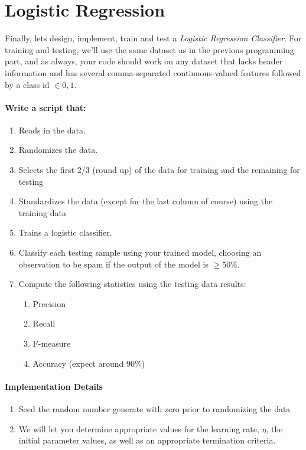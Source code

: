 \documentclass[12pt]{article}
\begin{document}
\newpage
\section{Logistic Regression}\label{naive}
Finally, lets design, implement, train and test a \emph{Logistic Regression Classifier}.  For training and testing, we'll use the same dataset as in the previous programming part, and as always, your code should work on any dataset that lacks header information and has several comma-separated continuous-valued features followed by a class id $\in {0,1}$.\\

\noindent
\paragraph{Write a script that:}
\begin{enumerate}
  \item Reads in the data.
  \item Randomizes the data.
  \item Selects the first 2/3 (round up) of the data for training and the remaining for testing
  \item Standardizes the data (except for the last column of course) using the training data
  \item Trains a logistic classifier.
  \item Classify each testing sample using your trained model, choosing an observation to be spam if the output of the model is $\geq 50\%$.  
  \item Compute the following statistics using the testing data results:
    \begin{enumerate}
        \item Precision
        \item Recall
        \item F-measure
        \item Accuracy (expect around 90\%)
    \end{enumerate}
\end{enumerate}


\paragraph{Implementation Details}
\begin{enumerate}
\item Seed the random number generate with zero prior to randomizing the data
\item We will let you determine appropriate values for the learning rate, $\eta$, the initial parameter values, as well as an appropriate termination criteria. 
\end{enumerate}
\end{document}
